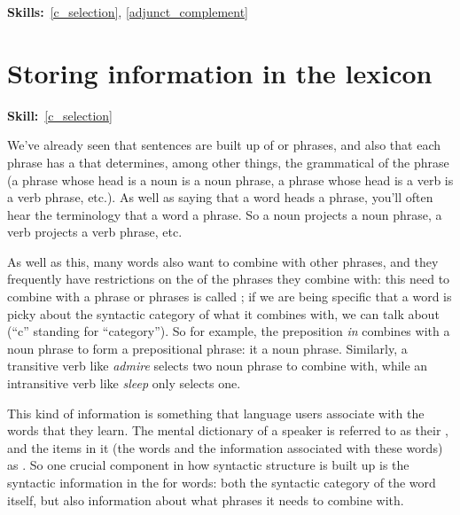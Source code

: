 \documentclass{article}
\begin{document}
\maketitle
\subtitle{Topic 4 Course Notes: Predicates and Arguments Part 2\\
Arguments Modifiers, and Subjects}
\hfill{}\textbf{Skills:}~\ref{c_selection},
\ref{adjunct_complement}

\section{Storing information in the lexicon}
\hfill{}\textbf{Skill:}~\ref{c_selection}

We've already seen that sentences are built up of  or phrases, and also that each phrase has a  that determines, among other things, the grammatical  of the phrase (a phrase whose head is a noun is a noun phrase, a phrase whose head is a verb is a verb phrase, etc.).
As well as saying that a word heads a phrase, you'll often hear the terminology that a word  a phrase.  So a noun projects a noun phrase, a verb projects a verb phrase, etc.

As well as this, many words also want to combine with other phrases, and they frequently have restrictions on the  of the phrases they combine with: this need to combine with a phrase or phrases is called ; if we are being specific that a word is picky about the syntactic category of what it combines with, we can talk about  (``c'' standing for ``category'').
So for example,  the preposition \emph{in} combines with a noun phrase to form a prepositional phrase: it  a noun phrase.
Similarly, a transitive verb like \emph{admire} selects two noun phrase to combine with, while an intransitive verb like \emph{sleep} only selects one.  

This kind of information is something that language users associate with the words that they learn.
The mental dictionary of a speaker is referred to as their , and the items in it (the words and the information associated with these words) as .
So one crucial component in how syntactic structure is built up is the syntactic information in the  for words: both the syntactic category of the word itself, but also information about what phrases it needs to combine with. 
\end{document}
